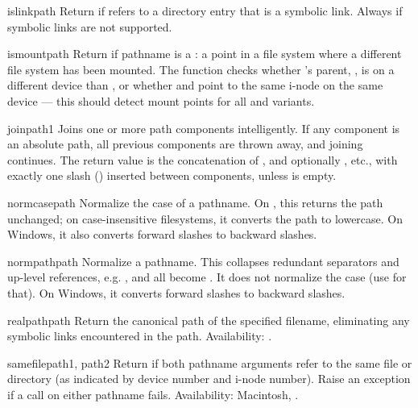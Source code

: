 \begin{funcdesc}{islink}{path}
Return  if  refers to a directory entry that is a
symbolic link.  Always  if symbolic links are not supported.
\end{funcdesc}

\begin{funcdesc}{ismount}{path}
Return  if pathname  is a : a point in
a file system where a different file system has been mounted.  The
function checks whether 's parent, , is
on a different device than , or whether 
and  point to the same i-node on the same device --- this
should detect mount points for all \UNIX{} and \POSIX{} variants.
\end{funcdesc}

\begin{funcdesc}{join}{path1}
Joins one or more path components intelligently.  If any component is
an absolute path, all previous components are thrown away, and joining
continues.  The return value is the concatenation of , and
optionally , etc., with exactly one slash ()
inserted between components, unless  is empty.
\end{funcdesc}

\begin{funcdesc}{normcase}{path}
Normalize the case of a pathname.  On \UNIX, this returns the path
unchanged; on case-insensitive filesystems, it converts the path to
lowercase.  On Windows, it also converts forward slashes to backward
slashes.
\end{funcdesc}

\begin{funcdesc}{normpath}{path}
Normalize a pathname.  This collapses redundant separators and
up-level references, e.g. ,  and
 all become .  It does not normalize the
case (use  for that).  On Windows, it converts
forward slashes to backward slashes.
\end{funcdesc}

\begin{funcdesc}{realpath}{path}
Return the canonical path of the specified filename, eliminating any
symbolic links encountered in the path.
Availability:  \UNIX.
\end{funcdesc}

\begin{funcdesc}{samefile}{path1, path2}
Return  if both pathname arguments refer to the same file or
directory (as indicated by device number and i-node number).
Raise an exception if a  call on either pathname
fails.
Availability:  Macintosh, \UNIX.
\end{funcdesc}

